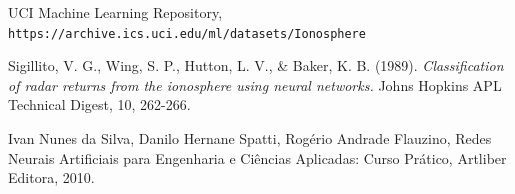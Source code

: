 \documentclass[12pt]{article}
\begin{document}
\begin{thebibliography}{99} 
	
	UCI Machine Learning Repository,\\ \texttt{https://archive.ics.uci.edu/ml/datasets/Ionosphere}
	
	 Sigillito, V. G., Wing, S. P., Hutton, L. V., \& Baker, K. B. (1989). \textit{Classification of radar returns from the ionosphere using neural networks.} Johns Hopkins APL Technical Digest, 10, 262-266.
	
	 Ivan Nunes da Silva, Danilo Hernane Spatti, Rogério Andrade Flauzino, \textit{}Redes Neurais Artificiais para Engenharia e Ciências
	Aplicadas: Curso Prático, Artliber Editora, 2010.
	
	
	
	
\end{thebibliography}
\end{document}
